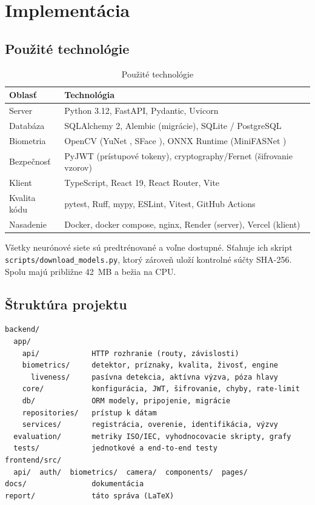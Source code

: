 \chapter{Implementácia}
\label{ch:implementacia}

\section{Použité technológie}

\begin{table}[H]
  \centering
  \caption{Použité technológie}
  \label{tab:technologie}
  \begin{tabularx}{\textwidth}{@{}l X@{}}
    \toprule
    Oblasť & Technológia \\
    \midrule
    Server & Python 3.12, FastAPI, Pydantic, Uvicorn \\
    Databáza & SQLAlchemy 2, Alembic (migrácie), SQLite / PostgreSQL \\
    Biometria & OpenCV (YuNet \cite{wu2023yunet}, SFace \cite{zhong2021sface}), ONNX Runtime (MiniFASNet \cite{minivision2020silentface}) \\
    Bezpečnosť & PyJWT (prístupové tokeny), cryptography/Fernet (šifrovanie vzorov) \\
    Klient & TypeScript, React 19, React Router, Vite \\
    Kvalita kódu & pytest, Ruff, mypy, ESLint, Vitest, GitHub Actions \\
    Nasadenie & Docker, docker compose, nginx, Render (server), Vercel (klient) \\
    \bottomrule
  \end{tabularx}
\end{table}

Všetky neurónové siete sú predtrénované a voľne dostupné. Sťahuje ich skript
\texttt{scripts/download\_models.py}, ktorý zároveň uloží kontrolné súčty SHA-256.
Spolu majú približne 42~MB a bežia na CPU.

\section{Štruktúra projektu}

\begin{lstlisting}
backend/
  app/
    api/            HTTP rozhranie (routy, závislosti)
    biometrics/     detektor, príznaky, kvalita, živosť, engine
      liveness/     pasívna detekcia, aktívna výzva, póza hlavy
    core/           konfigurácia, JWT, šifrovanie, chyby, rate-limit
    db/             ORM modely, pripojenie, migrácie
    repositories/   prístup k dátam
    services/       registrácia, overenie, identifikácia, výzvy
  evaluation/       metriky ISO/IEC, vyhodnocovacie skripty, grafy
  tests/            jednotkové a end-to-end testy
frontend/src/
  api/  auth/  biometrics/  camera/  components/  pages/
docs/               dokumentácia
report/             táto správa (LaTeX)
\end{lstlisting}

